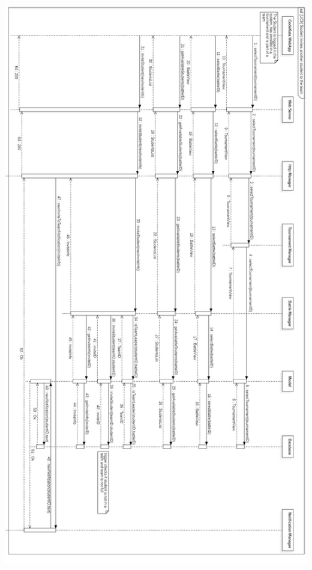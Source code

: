\documentclass{article}
\begin{document}
\newpage
\begin{center}
    \includegraphics[angle=90,width=0.7\linewidth]{uc9.jpg}
  \label{fig:uc9}
\end{center}
\end{document}
